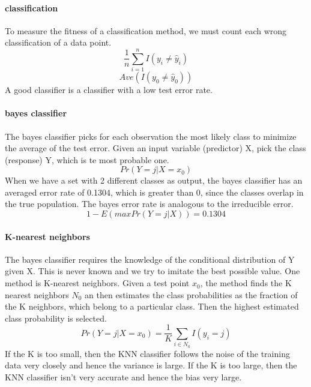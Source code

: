 \documentclass[../document.tex]{subfiles}
\begin{document}
	\paragraph{classification}
	To measure the fitness of a classification method, we must count each wrong classification of a data point.
	\begin{equation}
	\frac{1}{n}\sum_{i=1}^{n}I(y_{i} \neq \hat{y}_{i})
	\end{equation}
	\begin{equation}
	Ave(I(y_{0} \neq \hat{y}_{0}))
	\end{equation}
	A good classifier is a classifier with a low test error rate.

	\paragraph{bayes classifier}
	The bayes classifier picks for each observation the most likely class to minimize the average of the test error. Given an input variable (predictor) X, pick the class (response) Y, which is te most probable one.
	\begin{equation}
	Pr(Y=j|X=x_{0})
	\end{equation}
	When we have a set with 2 different classes as output, the bayes classifier has an averaged error rate of 0.1304, which is greater than 0, since the classes overlap in the true population. The bayes error rate is analogous to the irreducible error.
	\begin{equation}
	1 - E(maxPr(Y=j|X)) = 0.1304
	\end{equation}

	\paragraph{K-nearest neighbors}
	The bayes classifier requires the knowledge of the conditional distribution of Y given X. This is never known and we try to imitate the best possible value. One method is K-nearest neighbors. Given a test point \(x_{0}\), the method finds the K nearest neighbors \(N_{0}\) an then estimates the class probabilities as the fraction of the K neighbors, which belong to a particular class. Then the highest estimated class probability is selected.
	\begin{equation}
	Pr(Y=j|X=x_{0})=\frac{1}{K}\sum_{i \in N_{0}} I(y_{i}=j)
	\end{equation}
	If the K is too small, then the KNN classifier follows the noise of the training data very closely and hence the variance is large. If the K is too large, then the KNN classifier isn't very accurate and hence the bias very large.
\end{document}
